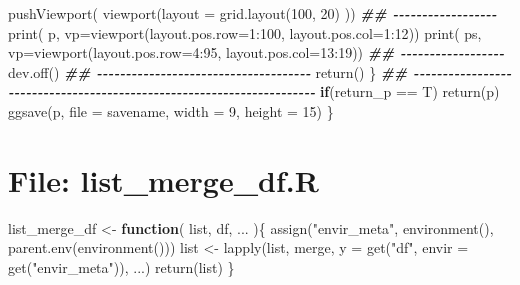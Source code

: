 \documentclass[
]{article}
\newenvironment{Shaded}{\begin{snugshade}}{\end{snugshade}}
\newcommand{\AttributeTok}[1]{\textcolor[rgb]{0.77,0.63,0.00}{#1}}
\newcommand{\ControlFlowTok}[1]{\textcolor[rgb]{0.13,0.29,0.53}{\textbf{#1}}}
\newcommand{\DecValTok}[1]{\textcolor[rgb]{0.00,0.00,0.81}{#1}}
\newcommand{\DocumentationTok}[1]{\textcolor[rgb]{0.56,0.35,0.01}{\textbf{\textit{#1}}}}
\newcommand{\FunctionTok}[1]{\textcolor[rgb]{0.00,0.00,0.00}{#1}}
\newcommand{\NormalTok}[1]{#1}
\newcommand{\OtherTok}[1]{\textcolor[rgb]{0.56,0.35,0.01}{#1}}
\newcommand{\SpecialCharTok}[1]{\textcolor[rgb]{0.00,0.00,0.00}{#1}}
\newcommand{\StringTok}[1]{\textcolor[rgb]{0.31,0.60,0.02}{#1}}
\begin{document}
\begin{Shaded}
\begin{Highlighting}[]
      \FunctionTok{pushViewport}\NormalTok{( }\FunctionTok{viewport}\NormalTok{(}\AttributeTok{layout =} \FunctionTok{grid.layout}\NormalTok{(}\DecValTok{100}\NormalTok{, }\DecValTok{20}\NormalTok{) ))}
      \DocumentationTok{\#\# {-}{-}{-}{-}{-}{-}{-}{-}{-}{-}{-}{-}{-}{-}{-}{-}{-}{-} }
      \FunctionTok{print}\NormalTok{( p, }\AttributeTok{vp=}\FunctionTok{viewport}\NormalTok{(}\AttributeTok{layout.pos.row=}\DecValTok{1}\SpecialCharTok{:}\DecValTok{100}\NormalTok{, }\AttributeTok{layout.pos.col=}\DecValTok{1}\SpecialCharTok{:}\DecValTok{12}\NormalTok{))}
      \FunctionTok{print}\NormalTok{( ps, }\AttributeTok{vp=}\FunctionTok{viewport}\NormalTok{(}\AttributeTok{layout.pos.row=}\DecValTok{4}\SpecialCharTok{:}\DecValTok{95}\NormalTok{, }\AttributeTok{layout.pos.col=}\DecValTok{13}\SpecialCharTok{:}\DecValTok{19}\NormalTok{))}
      \DocumentationTok{\#\# {-}{-}{-}{-}{-}{-}{-}{-}{-}{-}{-}{-}{-}{-}{-}{-}{-}{-} }
      \FunctionTok{dev.off}\NormalTok{()}
      \DocumentationTok{\#\# {-}{-}{-}{-}{-}{-}{-}{-}{-}{-}{-}{-}{-}{-}{-}{-}{-}{-}{-}{-}{-}{-}{-}{-}{-}{-}{-}{-}{-}{-}{-}{-}{-}{-}{-}{-}{-} }
      \FunctionTok{return}\NormalTok{()}
\NormalTok{    \}}
    \DocumentationTok{\#\# {-}{-}{-}{-}{-}{-}{-}{-}{-}{-}{-}{-}{-}{-}{-}{-}{-}{-}{-}{-}{-}{-}{-}{-}{-}{-}{-}{-}{-}{-}{-}{-}{-}{-}{-}{-}{-}{-}{-}{-}{-}{-}{-}{-}{-}{-}{-}{-}{-}{-}{-}{-}{-}{-}{-}{-}{-}{-}{-}{-}{-}{-}{-}{-}{-}{-}{-}{-}{-}{-} }
    \ControlFlowTok{if}\NormalTok{(return\_p }\SpecialCharTok{==}\NormalTok{ T)}
      \FunctionTok{return}\NormalTok{(p)}
    \FunctionTok{ggsave}\NormalTok{(p, }\AttributeTok{file =}\NormalTok{ savename, }\AttributeTok{width =} \DecValTok{9}\NormalTok{, }\AttributeTok{height =} \DecValTok{15}\NormalTok{)}
\NormalTok{  \}}
\end{Highlighting}
\end{Shaded}

\hypertarget{file-list_merge_df.r}{%
\section{File: list\_merge\_df.R}\label{file-list_merge_df.r}}

\begin{Shaded}
\begin{Highlighting}[]
\NormalTok{list\_merge\_df }\OtherTok{\textless{}{-}} 
  \ControlFlowTok{function}\NormalTok{(}
\NormalTok{           list,}
\NormalTok{           df,}
\NormalTok{           ...}
\NormalTok{           )\{}
    \FunctionTok{assign}\NormalTok{(}\StringTok{"envir\_meta"}\NormalTok{, }\FunctionTok{environment}\NormalTok{(), }\FunctionTok{parent.env}\NormalTok{(}\FunctionTok{environment}\NormalTok{()))}
\NormalTok{    list }\OtherTok{\textless{}{-}} \FunctionTok{lapply}\NormalTok{(list, merge,}
                   \AttributeTok{y =} \FunctionTok{get}\NormalTok{(}\StringTok{"df"}\NormalTok{, }\AttributeTok{envir =} \FunctionTok{get}\NormalTok{(}\StringTok{"envir\_meta"}\NormalTok{)),}
\NormalTok{                   ...)}
    \FunctionTok{return}\NormalTok{(list)}
\NormalTok{  \}}
\end{Highlighting}
\end{Shaded}
\end{document}
